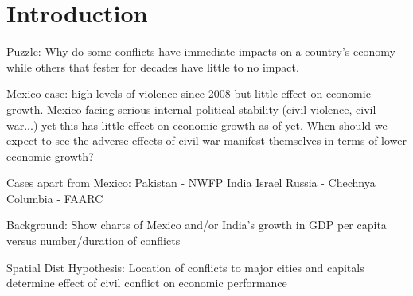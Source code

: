\section{Introduction}
\label{intro}

Puzzle: Why do some conflicts have immediate impacts on a country's economy while others that fester for decades have little to no impact. 

	Mexico case: high levels of violence since 2008 but little effect on economic growth. Mexico facing serious internal political stability (civil violence, civil war...) yet this has little effect on economic growth as of yet. When should we expect to see the adverse effects of civil war manifest themselves in terms of lower economic growth?

	Cases apart from Mexico:
		Pakistan - NWFP
		India
		Israel
		Russia - Chechnya
		Columbia - FAARC

Background: Show charts of Mexico and/or India's growth in GDP per capita versus number/duration of conflicts 

Spatial Dist Hypothesis: Location of conflicts to major cities and capitals determine effect of civil conflict on economic performance